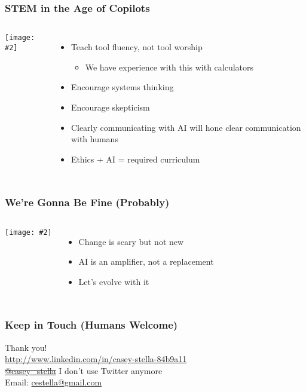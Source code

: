 \documentclass{beamer}
\newcommand{\slidewithimage}[3]{%
  \begin{frame}
    \frametitle{#1}
    \begin{columns}
      \column{0.5\textwidth}
        \texttt{[image: \#2]}\\[1em]
      \column{0.5\textwidth}
        #3
    \end{columns}
  \end{frame}
}
\begin{document}
\slidewithimage{STEM in the Age of Copilots}{education-image.png}{
  \begin{itemize}
    \item Teach tool fluency, not tool worship
    \begin{itemize}
      \item We have experience with this with calculators
    \end{itemize}
    \item Encourage systems thinking
    \item Encourage skepticism
    \item Clearly communicating with AI will hone clear communication with humans
    \item Ethics + AI = required curriculum
  \end{itemize}
}

\slidewithimage{We’re Gonna Be Fine (Probably)}{wrap-image.png}{
  \begin{itemize}
    \item Change is scary but not new
    \item AI is an amplifier, not a replacement
    \item Let’s evolve with it
  \end{itemize}
}

\begin{frame}
  \frametitle{Keep in Touch (Humans Welcome)}
  \begin{center}
    \Large Thank you! \\
    \vspace{1em}
    \href{http://www.linkedin.com/in/casey-stella-84b9a11}{http://www.linkedin.com/in/casey-stella-84b9a11} \\
    \sout{\href{https://twitter.com/casey_stella}{@casey\_stella}} I don't use Twitter anymore \\
    Email: \href{mailto:cestella@gmail.com}{cestella@gmail.com}
  \end{center}
\end{frame}
\end{document}
